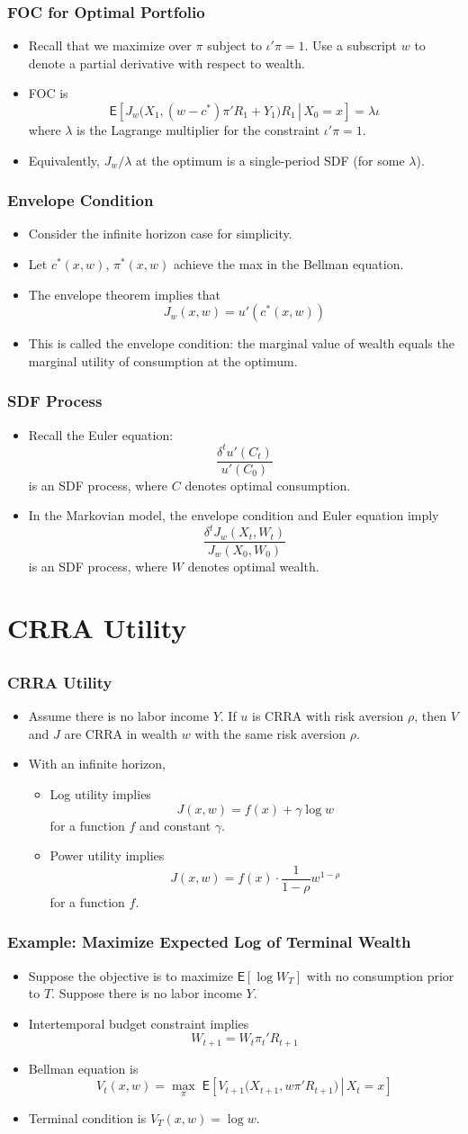 \documentclass[10pt]{beamer}
\newcommand{\bi}{\begin{itemize}}
\newcommand{\ei}{\end{itemize}}
\newcommand{\im}{\item}
\newcommand{\mye}{\ensuremath{\mathsf{E}}}
\newcommand{\bfr}{\begin{frame}}
\begin{document}
\bfr\frametitle{FOC for Optimal Portfolio}
\bi
\im Recall that we maximize over $\pi$ subject to $\iota'\pi=1$.  Use a subscript $w$ to denote a partial derivative with respect to wealth. 
\im FOC is
$$\mye\left[\left.J_w\bigg(X_{1},(w-c^*)\pi'R_{1}+ Y_1\bigg)R_{1}\,\right|\, X_0=x\right] = \lambda \iota$$
where $\lambda$ is the Lagrange multiplier for the constraint $\iota'\pi=1$.
\im Equivalently, $J_w/\lambda$ at the optimum is a single-period SDF (for some $\lambda$).
\ei
\end{frame}

\bfr\frametitle{Envelope Condition}
\bi
\im Consider the infinite horizon case for simplicity.

\im Let $c^*(x,w)$, $\pi^*(x,w)$ achieve the max in the Bellman equation.  
\im The envelope theorem implies that
$$J_w(x,w) = u'(c^*(x,w))$$
\im This is called the envelope condition: the marginal value of wealth equals the marginal utility of consumption at the optimum.
\ei
\end{frame}

\bfr\frametitle{SDF Process}
\bi
\im Recall the Euler equation:
$$\frac{\delta^t u'(C_t)}{u'(C_0)}$$
is an SDF process, where $C$ denotes optimal consumption.
\im In the Markovian model, the envelope condition and Euler equation imply
$$\frac{\delta^t J_w(X_t,W_t)}{J_w(X_0,W_0)}$$
is an SDF process, where $W$ denotes optimal wealth.
\ei
\end{frame}

\section{CRRA Utility}
\subsection{}

\bfr\frametitle{CRRA Utility}
\bi
\im Assume there is no labor income $Y$.  If $u$ is CRRA with risk aversion $\rho$, then $V$ and $J$ are CRRA in wealth $w$ with the same risk aversion $\rho$.
\im With an infinite horizon,
\bi
\im Log utility implies 
$$J(x,w) = f(x) + \gamma \log w$$ for a function $f$ and constant $\gamma$.
\im Power utility implies 
$$J(x,w) = f(x) \cdot \frac{1}{1-\rho}w^{1-\rho}$$
for a function $f$.
\ei 
\ei
\end{frame}

\bfr\frametitle{Example: Maximize Expected Log of Terminal Wealth}
\bi
\im Suppose the objective is to maximize $\mye[\log W_T]$ with no consumption prior to $T$.  Suppose there is no labor income $Y$.
\im Intertemporal budget constraint implies
$$W_{t+1} = W_t\pi_t'R_{t+1}$$
\im Bellman equation is
 $$V_t(x,w) = \max_{\pi} \; \mye\left[\left. V_{t+1}\bigg(X_{t+1},w\pi'R_{t+1}\bigg)\,\right|\, X_t=x\right]$$
 \im Terminal condition is $V_T(x,w) = \log w$.
 \ei
\end{frame}
\end{document}
